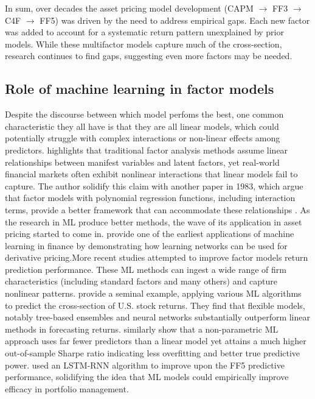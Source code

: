 In sum, over decades the asset pricing model development (CAPM $\rightarrow$ FF3 $\rightarrow$ C4F $\rightarrow$ FF5) was driven by the need to address empirical gaps. Each new factor was added to account for a systematic return pattern unexplained by prior models. While these multifactor models capture much of the cross-section, research continues to find gaps, suggesting even more factors may be needed.


\subsection{Role of machine learning in factor models}

Despite the discourse between which model perfoms the best, one common characteristic they all have is that they are all linear models, which could potentially struggle with complex interactions or non-linear effects among predictors.  highlights that traditional factor analysis methods assume linear relationships between manifest variables and latent factors, yet real-world financial markets often exhibit nonlinear interactions that linear models fail to capture. The author solidify this claim with another paper in 1983, which argue that factor models with polynomial regression functions, including interaction terms, provide a better framework that can accommodate these relationships \cite{mcdonald_1983}. As the research in ML produce better methods, the wave of its application in asset pricing started to come in.   provide one of the earliest applications of machine learning in finance by demonstrating how learning networks can be used for derivative pricing.More recent studies attempted to improve factor models return prediction performance. These ML methods can ingest a wide range of firm characteristics (including standard factors and many others) and capture nonlinear patterns.  provide a seminal example, applying various ML algorithms to predict the cross-section of U.S. stock returns. They find that flexible models, notably tree-based ensembles and neural networks substantially outperform linear methods in forecasting returns.  similarly show that a non-parametric ML approach uses far fewer predictors than a linear model yet attains a much higher out-of-sample Sharpe ratio indicating less overfitting and better true predictive power.  used an LSTM-RNN algorithm to improve upon the FF5 predictive performance, solidifying the idea that ML models could empirically improve efficacy in portfolio management.

